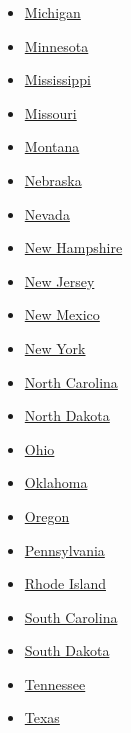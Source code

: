 \begin{itemize}
\item
  \href{//www.nytimes.com/elections/2016/results/michigan}{Michigan}
\item
  \href{//www.nytimes.com/elections/2016/results/minnesota}{Minnesota}
\item
  \href{//www.nytimes.com/elections/2016/results/mississippi}{Mississippi}
\item
  \href{//www.nytimes.com/elections/2016/results/missouri}{Missouri}
\item
  \href{//www.nytimes.com/elections/2016/results/montana}{Montana}
\item
  \href{//www.nytimes.com/elections/2016/results/nebraska}{Nebraska}
\item
  \href{//www.nytimes.com/elections/2016/results/nevada}{Nevada}
\item
  \href{//www.nytimes.com/elections/2016/results/new-hampshire}{New
  Hampshire}
\item
  \href{//www.nytimes.com/elections/2016/results/new-jersey}{New Jersey}
\item
  \href{//www.nytimes.com/elections/2016/results/new-mexico}{New Mexico}
\item
  \href{//www.nytimes.com/elections/2016/results/new-york}{New York}
\item
  \href{//www.nytimes.com/elections/2016/results/north-carolina}{North
  Carolina}
\item
  \href{//www.nytimes.com/elections/2016/results/north-dakota}{North
  Dakota}
\item
  \href{//www.nytimes.com/elections/2016/results/ohio}{Ohio}
\item
  \href{//www.nytimes.com/elections/2016/results/oklahoma}{Oklahoma}
\item
  \href{//www.nytimes.com/elections/2016/results/oregon}{Oregon}
\item
  \href{//www.nytimes.com/elections/2016/results/pennsylvania}{Pennsylvania}
\item
  \href{//www.nytimes.com/elections/2016/results/rhode-island}{Rhode
  Island}
\item
  \href{//www.nytimes.com/elections/2016/results/south-carolina}{South
  Carolina}
\item
  \href{//www.nytimes.com/elections/2016/results/south-dakota}{South
  Dakota}
\item
  \href{//www.nytimes.com/elections/2016/results/tennessee}{Tennessee}
\item
  \href{//www.nytimes.com/elections/2016/results/texas}{Texas}

\end{itemize}
